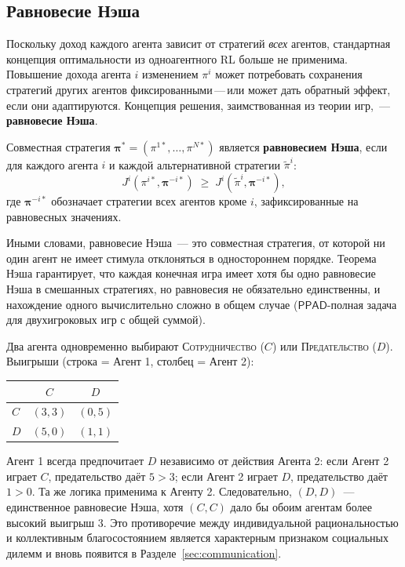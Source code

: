 \subsection{Равновесие Нэша}

Поскольку доход каждого агента зависит от стратегий \emph{всех}
агентов, стандартная концепция оптимальности из одноагентного RL
больше не применима. Повышение дохода агента $i$ изменением $\pi^i$ может
потребовать сохранения стратегий других агентов фиксированными\,---\,или может
дать обратный эффект, если они адаптируются. Концепция решения, заимствованная из теории игр,~---
\textbf{равновесие Нэша}.

\begin{definition}
\label{def:nash}
Совместная стратегия $\boldsymbol{\pi}^* = (\pi^{1*}, \ldots, \pi^{N*})$
является \textbf{равновесием Нэша}, если для каждого агента $i$ и каждой
альтернативной стратегии $\tilde\pi^i$:
\[
  J^i(\pi^{i*}, \boldsymbol{\pi}^{-i*}) \;\geq\;
  J^i(\tilde\pi^i, \boldsymbol{\pi}^{-i*}),
\]
где $\boldsymbol{\pi}^{-i*}$ обозначает стратегии всех агентов
кроме $i$, зафиксированные на равновесных значениях.
\end{definition}

Иными словами, равновесие Нэша~--- это совместная стратегия, от которой ни один
агент не имеет стимула отклоняться в одностороннем порядке. Теорема Нэша
гарантирует, что каждая конечная игра имеет хотя бы одно равновесие Нэша
в смешанных стратегиях, но равновесия не обязательно единственны, и нахождение
одного вычислительно сложно в общем случае ($\mathsf{PPAD}$-полная задача для
двухигроковых игр с общей суммой).

\begin{example}
\label{ex:prisoners}
Два агента одновременно выбирают \textsc{Сотрудничество} ($C$) или
\textsc{Предательство} ($D$). Выигрыши (строка = Агент 1, столбец = Агент 2):
\begin{center}
\small
\begin{tabular}{@{}lcc@{}}
\toprule
 & $C$ & $D$ \\
\midrule
$C$ & $(3,3)$ & $(0,5)$ \\
$D$ & $(5,0)$ & $(1,1)$ \\
\bottomrule
\end{tabular}
\end{center}
Агент 1 всегда предпочитает $D$ независимо от действия Агента 2: если Агент 2
играет $C$, предательство даёт $5 > 3$; если Агент 2 играет $D$, предательство
даёт $1 > 0$. Та же логика применима к Агенту 2. Следовательно, $(D, D)$~---
единственное равновесие Нэша, хотя $(C, C)$ дало бы обоим
агентам более высокий выигрыш $3$. Это противоречие между индивидуальной
рациональностью и коллективным благосостоянием является характерным признаком социальных
дилемм и вновь появится в
Разделе~\ref{sec:communication}.
\end{example}

